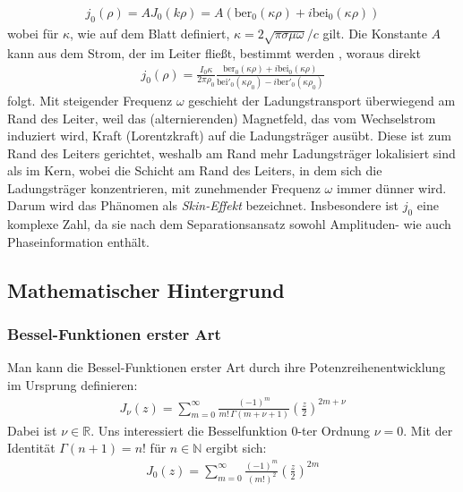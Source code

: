 \documentclass[10pt,a4paper]{article}
\begin{document}
\begin{align}
	j_0(\rho)=A J_0(k \rho) = A(\mathrm{ber}_0(\kappa \rho)+i\mathrm{bei}_0(\kappa \rho))
\end{align}
wobei für $\kappa$, wie auf dem Blatt definiert, $\kappa = 2 \sqrt{\pi \sigma \mu \omega}/c$ gilt.
Die Konstante $A$ kann aus dem Strom, der im Leiter fließt, bestimmt werden \cite{kazimierczuk}, woraus direkt
\begin{align}
	j_0(\rho) = \frac{I_0 \kappa}{2\pi\rho_0}\frac{\mathrm{ber}_0(\kappa\rho)+i \mathrm{bei}_0(\kappa\rho)}{\mathrm{bei}'_0(\kappa\rho_0)-i\mathrm{ber}'_0(\kappa\rho_0)}
\label{eq:stromdichte}
\end{align}
folgt. Mit steigender Frequenz $\omega$ geschieht der Ladungstransport überwiegend am Rand des Leiter, weil das (alternierenden) Magnetfeld, das vom Wechselstrom induziert wird, Kraft (Lorentzkraft) auf die Ladungsträger ausübt. Diese ist zum Rand des Leiters gerichtet, weshalb am Rand mehr Ladungsträger lokalisiert sind als im Kern, wobei die Schicht am Rand des Leiters, in dem sich die Ladungsträger konzentrieren, mit zunehmender Frequenz $\omega$ immer dünner wird. Darum wird das Phänomen als \emph{Skin-Effekt} bezeichnet. Insbesondere ist $j_0$ eine komplexe Zahl, da sie nach dem Separationsansatz sowohl Amplituden- wie auch Phaseinformation enthält.

\subsection{Mathematischer Hintergrund}

\subsubsection{Bessel-Funktionen erster Art}

Man kann die Bessel-Funktionen erster Art durch ihre Potenzreihenentwicklung im Ursprung definieren:
\begin{align}
	J_\nu(z) = \sum^{\infty}_{m=0} \frac{\left( -1 \right)^m}{m! \, \Gamma(m + \nu + 1)} \left(\frac{z}{2}\right)^{2m+\nu}
\end{align}
Dabei ist $\nu \in \mathbb{R}$. Uns interessiert die Besselfunktion 0-ter Ordnung $\nu = 0$.
Mit der Identität $\Gamma(n+1) = n!$ für $n \in \mathbb{N}$ ergibt sich:
\begin{align}
	\label{eq:bessel0}
	J_0(z) = \sum^{\infty}_{m=0} \frac{\left( -1 \right)^m}{\left( m! \right)^2} \left( \frac{z}{2} \right)^{2m}
\end{align}
\end{document}
